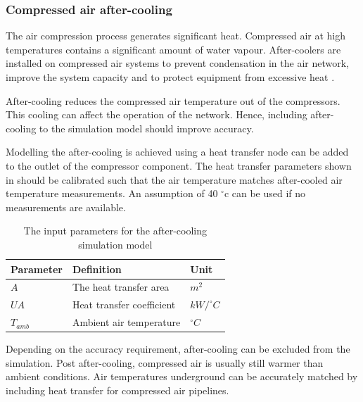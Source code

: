 		\subsubsection{Compressed air after-cooling}
		The air compression process generates significant heat. Compressed air at high temperatures contains a significant amount of water vapour. After-coolers are installed on compressed air systems to prevent condensation in the air network, improve the system capacity and to protect equipment from excessive heat \cite{schroeder2009energy}.
		\par 
		After-cooling reduces the compressed air temperature out of the compressors. This cooling can affect the operation of the network. Hence, including after-cooling to the simulation model should improve accuracy.
		\par
		Modelling the after-cooling is achieved using a heat transfer node can be added to the outlet of the compressor component. The heat transfer parameters shown in  should be calibrated such that the air temperature matches after-cooled air temperature measurements. An assumption of 40 $^\circ$\gls{c} can be used if no measurements are available.
		\begin{table}
			\centering
			\begin{tabular}{lll}
				\hline 
				Parameter \hspace{1cm} & Definition \hspace{4cm} & Unit \\
				\hline
				$A$ & The heat transfer area & $m^2$ \\
				$UA$ & Heat transfer coefficient & $kW/^{\circ} C$ \\
				$T_{amb}$ & Ambient air temperature & $^{\circ} C$ \\
				\hline
			\end{tabular}
		\caption{The input parameters for the after-cooling simulation model}
		\label{table: After cooling inputs}
		\end{table}
	Depending on the accuracy requirement, after-cooling can be excluded from the simulation. Post after-cooling, compressed air is usually still warmer than ambient conditions. Air temperatures underground can be accurately matched by including heat transfer for compressed air pipelines.
	
